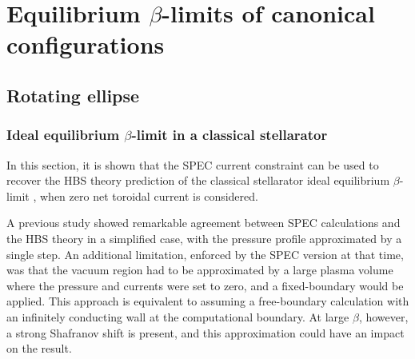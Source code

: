 \documentclass[my_thesis.tex]{subfiles}
\begin{document}
\chapter{Equilibrium $\beta$-limits of canonical configurations}

\section{Rotating ellipse}

\subsection{Ideal equilibrium $\beta$-limit in a classical stellarator} \label{sec.idealbetalimit}

In this section, it is shown that the \ac{SPEC} current constraint can be used to recover the \ac{HBS} theory prediction of the classical stellarator ideal equilibrium $\beta$-limit \citep{Freidberg2014,wakatani_stellarator_1998}, when zero net toroidal current is considered.  

A previous study \citep{Loizu2017} showed remarkable agreement between \ac{SPEC} calculations and the \ac{HBS} theory in a simplified case, with the pressure profile approximated by a single step. An additional limitation, enforced by the \ac{SPEC} version at that time, was that the vacuum region had to be approximated by a large plasma volume where the pressure and currents were set to zero, and a fixed-boundary would be applied. This approach is equivalent to assuming a free-boundary calculation with an infinitely conducting wall at the computational boundary. At large $\beta$, however, a strong Shafranov shift is present, and this approximation could have an impact on the result.
\end{document}
